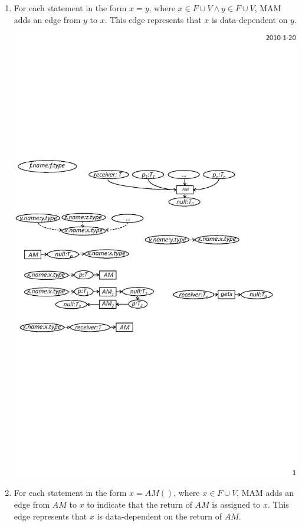 \begin{enumerate}
\item For each statement in the form $x = y$, where $x \in F \cup V \wedge y \in F \cup V$,
MAM adds an edge from $y$ to $x$. This edge represents that
$x$ is data-dependent on $y$.\vspace*{-1.5ex}

\begin{center}
\includegraphics[scale=0.7,clip]{figure/rule4.eps}%
\end{center}\vspace*{-4ex}

\item For each statement in the form $x = AM()$, where $x \in F \cup V$, MAM
adds an edge from $AM$ to $x$ to indicate that the return of $AM$ is
assigned to $x$. This edge represents that $x$ is data-dependent on
the return of $AM$. \vspace*{-2ex}


\end{enumerate}
